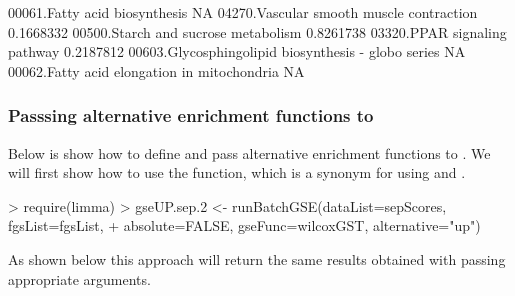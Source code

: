 \documentclass[11pt]{article}
\newcommand{\Rcode}[1]{{\texttt{\color{BrickRed}{#1}}}}
\renewenvironment{Schunk}{\vspace{\topsep}}{\vspace{\topsep}}
\begin{document}
\begin{Schunk}
\begin{Soutput}
                      00061.Fatty acid biosynthesis 
                                                 NA 
           04270.Vascular smooth muscle contraction 
                                          0.1668332 
                00500.Starch and sucrose metabolism 
                                          0.8261738 
                       03320.PPAR signaling pathway 
                                          0.2187812 
00603.Glycosphingolipid biosynthesis - globo series 
                                                 NA 
        00062.Fatty acid elongation in mitochondria 
                                                 NA 
\end{Soutput}
\end{Schunk}


\subsubsection{Passsing alternative enrichment functions to  \Rcode{runBatchGSE} }
Below is show how to define and pass alternative enrichment functions 
to \Rcode{runBatchGSE}.
We will first show how to use the \Rcode{limma} \Rcode{wilcoxGST} function,
which is a synonym for \Rcode{geneSetTest} using \Rcode{ranks.only=TRUE}
and \Rcode{type="t"}.

\begin{Schunk}
\begin{Sinput}
> require(limma)
> gseUP.sep.2 <- runBatchGSE(dataList=sepScores, fgsList=fgsList,
+ 				 absolute=FALSE, gseFunc=wilcoxGST, alternative="up")
\end{Sinput}
\end{Schunk}

As shown below this approach will return the same results
obtained with \Rcode{geneSetTest} passing appropriate arguments.
\end{document}
